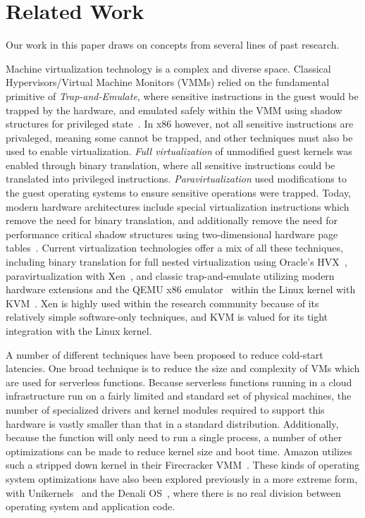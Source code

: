 \section{Related Work} \label{sec:related}
Our work in this paper draws on concepts from several lines of past research.

 Machine virtualization technology is
a complex and diverse space. Classical Hypervisors/Virtual Machine Monitors
(VMMs) relied on the fundamental primitive of \emph{Trap-and-Emulate}, where
sensitive instructions in the guest would be trapped by the hardware, and
emulated safely within the VMM using shadow structures for privileged
state~\cite{classic-virt}. In x86 however, not all sensitive instructions are
privaleged, meaning some cannot be trapped, and other techniques must also be used
to enable virtualization. \emph{Full virtualization} of unmodified guest
kernels was enabled through binary translation, where all sensitive
instructions could be translated into privileged instructions.
\emph{Paravirtualization} used modifications to the guest operating systems to
ensure sensitive operations were trapped. Today, modern hardware architectures
include special virtualization instructions which remove the need for binary
translation, and additionally remove the need for performance critical shadow
structures using two-dimensional hardware page tables~\cite{virt-techniques}.
Current virtualization technologies offer a mix of all these techniques,
including binary translation for full nested virtualization using Oracle's
HVX~\cite{hvx}, paravirtualization with Xen~\cite{xen}, and classic
trap-and-emulate utilizing modern hardware extensions and the QEMU x86
emulator~\cite{qemu} within the Linux kernel with KVM~\cite{kvm}. Xen is highly
used within the research community because of its relatively simple
software-only techniques, and KVM is valued for its tight integration with the
Linux kernel.

 A number of different techniques have
been proposed to reduce cold-start latencies. One broad technique is to reduce
the size and complexity of VMs which are used for serverless functions. Because
serverless functions running in a cloud infrastructure run on a fairly limited
and standard set of physical machines, the number of specialized drivers and
kernel modules required to support this hardware is vastly smaller than that in
a standard distribution.  Additionally, because the function will only need to
run a single process, a number of other optimizations can be made to reduce
kernel size and boot time. Amazon utilizes such a stripped down kernel in their
Firecracker VMM~\cite{firecracker}. These kinds of operating system
optimizations have also been explored previously in a more extreme form, with
Unikernels~\cite{unikernels} and the Denali OS~\cite{denali}, where there is no
real division between operating system and application code.

